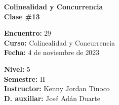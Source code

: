 \begin{center} \textbf
{
    \Large Colinealidad y Concurrencia \\ \vspace{2mm}Clase \#13
}
\end{center}

\begin{multicols}{2}
{
    \textbf{Encuentro:} 29\\
    \textbf{Curso:} Colinealidad y Concurrencia\\
    \textbf{Fecha:} 4 de noviembre de 2023\\
    \begin{flushright}
        \textbf{Nivel:} 5\\
        \textbf{Semestre:} II\\
        \textbf{Instructor:} Kenny Jordan Tinoco\\
        \textbf{D. auxiliar:} José Adán Duarte
    \end{flushright}
}
\end{multicols}

\thispagestyle{first-page-style}